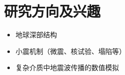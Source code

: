 \section*{研究方向及兴趣}

\begin{itemize}
\item 地球深部结构
\item 小震机制（微震、核试验、塌陷等）
\item 复杂介质中地震波传播的数值模拟
\end{itemize}

